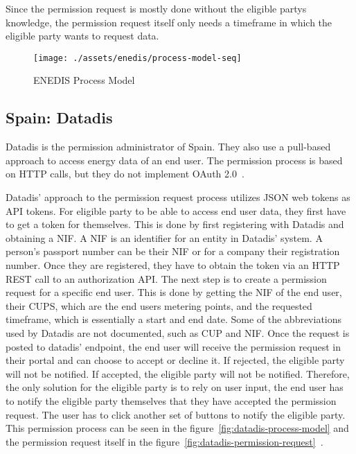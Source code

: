Since the permission request is mostly done without the eligible partys knowledge, the permission request itself only needs a timeframe in which the eligible party wants to request data.

\begin{figure}[h]
    \texttt{[image: ./assets/enedis/process-model-seq]}
    \caption{ENEDIS Process Model}
    \label{fig:enedis-process-model}
\end{figure}

\subsection{Spain: Datadis}\label{subsec:spain:-datadis}
Datadis is the permission administrator of Spain.
They also use a pull-based approach to access energy data of an end user.
The permission process is based on HTTP calls, but they do not implement OAuth 2.0~\cite{datadis-dev-guide}.

Datadis' approach to the permission request process utilizes JSON web tokens as API tokens.
For eligible party to be able to access end user data, they first have to get a token for themselves.
This is done by first registering with Datadis and obtaining a NIF.
A NIF is an identifier for an entity in Datadis' system.
A person's passport number can be their NIF or for a company their registration number.
Once they are registered, they have to obtain the token via an HTTP REST call to an authorization API.
The next step is to create a permission request for a specific end user.
This is done by getting the NIF of the end user, their CUPS, which are the end users metering points, and the requested timeframe, which is essentially a start and end date.
Some of the abbreviations used by Datadis are not documented, such as CUP and NIF.
Once the request is posted to datadis' endpoint, the end user will receive the permission request in their portal and can choose to accept or decline it.
If rejected, the eligible party will not be notified.
If accepted, the eligible party will not be notified.
Therefore, the only solution for the eligible party is to rely on user input, the end user has to notify the eligible party themselves that they have accepted the permission request.
The user has to click another set of buttons to notify the eligible party.
This permission process can be seen in the figure\ \ref{fig:datadis-process-model} and the permission request itself in the figure\ \ref{fig:datadis-permission-request}~\cite{datadis-dev-guide, bprt-issues}.

